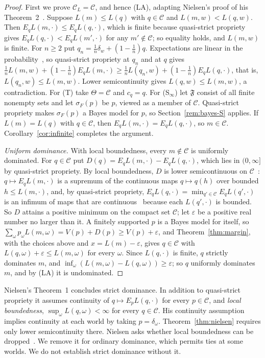 \documentclass[11pt]{article}
\theoremstyle{definition}
\theoremstyle{remark}
\newcommand{\C}{\mathcal C}
\newcommand{\F}{\mathfrak F}
\begin{document}
\begin{proof}


First we prove $\C_L=\C$, and hence (LA), adapting Nielsen's proof of his Theorem~2~\cite{Nielsen}. Suppose $L(m)\le L(q)$ with $q\in\C$ and $L(m,w)<L(q,w)$. Then $E_qL(m,\cdot)\le E_qL(q,\cdot)$, which is finite because quasi-strict propriety gives $E_qL(q,\cdot)<E_qL(m',\cdot)$ for any $m'\notin\C$; so equality holds, and $L(m,w)$ is finite. For $n\ge2$ put $q_n=\frac1n\delta_w+(1-\frac1n)q$. Expectations are linear in the probability~\cite[Appendix~A, Proposition~1]{Nielsen}, so quasi-strict propriety at $q_n$ and at $q$ gives $\frac1nL(m,w)+(1-\frac1n)E_qL(m,\cdot)\ge\frac1nL(q_n,w)+(1-\frac1n)E_qL(q,\cdot)$, that is, $L(q_n,w)\le L(m,w)$. Lower semicontinuity gives $L(q,w)\le L(m,w)$, a contradiction. For (T) take $\Theta=\C$ and $c_q=q$. For (S$_\infty$) let $\F$ consist of all finite nonempty sets and let $\sigma_F(p)$ be $p$, viewed as a member of $\C$. Quasi-strict propriety makes $\sigma_F(p)$ a Bayes model for $p$, so Section~\ref{rem:bayes-S} applies. If $L(m)=L(q)$ with $q\in\C$, then $E_qL(m,\cdot)=E_qL(q,\cdot)$, so $m\in\C$. Corollary~\ref{cor:infinite} completes the argument.

\emph{Uniform dominance.} With local boundedness, every $m\notin\C$ is uniformly dominated. For $q\in\C$ put $D(q)=E_qL(m,\cdot)-E_qL(q,\cdot)$, which lies in $(0,\infty]$ by quasi-strict propriety. By local boundedness, $D$ is lower semicontinuous on $\C$~\cite[Lemma~3]{Nielsen}: $q\mapsto E_qL(m,\cdot)$ is a supremum of the continuous maps $q\mapsto q(h)$ over bounded $h\le L(m,\cdot)$, and, by quasi-strict propriety, $E_qL(q,\cdot)=\min_{q'\in\C}E_qL(q',\cdot)$ is an infimum of maps that are continuous~\cite[Lemma~1]{Nielsen} because each $L(q',\cdot)$ is bounded. So $D$ attains a positive minimum on the compact set $\C$; let $\varepsilon$ be a positive real number no larger than it. A finitely supported $p$ is a Bayes model for itself, so $\sum_\omega p_\omega L(m,\omega)=V(p)+D(p)\ge V(p)+\varepsilon$, and Theorem~\ref{thm:margin}, with the choices above and $x=L(m)-\varepsilon$, gives $q\in\C$ with $L(q,\omega)+\varepsilon\le L(m,\omega)$ for every $\omega$. Since $L(q,\cdot)$ is finite, $q$ strictly dominates $m$, and $\inf_\omega(L(m,\omega)-L(q,\omega))\ge\varepsilon$; so $q$ uniformly dominates $m$, and by (LA) it is undominated.
\end{proof}

Nielsen's Theorem~1 concludes strict dominance. In addition to quasi-strict propriety it assumes continuity of $q\mapsto E_pL(q,\cdot)$ for every $p\in\C$, and \emph{local boundedness}, $\sup_\omega L(q,\omega)<\infty$ for every $q\in\C$. His continuity assumption implies continuity at each world by taking $p=\delta_\omega$. Theorem~\ref{thm:nielsen} requires only lower semicontinuity there. Nielsen asks whether local boundedness can be dropped~\cite[\S4.2.1]{Nielsen}. We remove it for ordinary dominance, which permits ties at some worlds. We do not establish strict dominance without it.
\end{document}
